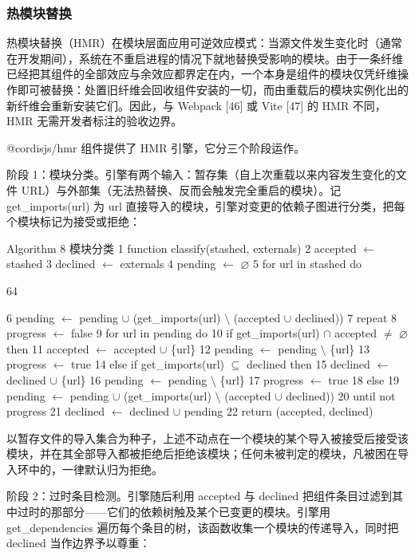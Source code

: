 \documentclass[
  10
]{article}
\begin{document}
\subsubsection{热模块替换} \label{hot-module-replacement}

热模块替换（HMR）在模块层面应用可逆效应模式：当源文件发生变化时（通常在开发期间），系统在不重启进程的情况下就地替换受影响的模块。由于一条纤维已经把其组件的全部效应与余效应都界定在内，一个本身是组件的模块仅凭纤维操作即可被替换：处置旧纤维会回收组件安装的一切，而由重载后的模块实例化出的新纤维会重新安装它们。因此，与 Webpack {[}46{]} 或 Vite {[}47{]} 的 HMR 不同，HMR 无需开发者标注的验收边界。

@cordisjs/hmr 组件提供了 HMR 引擎，它分三个阶段运作。

阶段 1：模块分类。引擎有两个输入：暂存集（自上次重载以来内容发生变化的文件 URL）与外部集（无法热替换、反而会触发完全重启的模块）。记 get\_imports(url) 为 url 直接导入的模块，引擎对变更的依赖子图进行分类，把每个模块标记为接受或拒绝：

Algorithm 8 模块分类 1 function classify(stashed,
externals) 2 accepted $\leftarrow$ stashed 3 declined $\leftarrow$ externals 4 pending $\leftarrow$ $\varnothing$ 5
for url in stashed do

64

6 pending $\leftarrow$ pending $\cup$ (get\_imports(url) $\setminus$ (accepted $\cup$ declined)) 7
repeat 8 progress $\leftarrow$ false 9 for url in pending do 10 if
get\_imports(url) $\cap$ accepted $\neq$ $\varnothing$ then 11 accepted $\leftarrow$ accepted $\cup$ \{url\}
12 pending $\leftarrow$ pending $\setminus$ \{url\} 13 progress $\leftarrow$ true 14 else if
get\_imports(url) $\subseteq$ declined then 15 declined $\leftarrow$ declined $\cup$ \{url\} 16
pending $\leftarrow$ pending $\setminus$ \{url\} 17 progress $\leftarrow$ true 18 else 19 pending $\leftarrow$
pending $\cup$ (get\_imports(url) $\setminus$ (accepted $\cup$ declined)) 20 until not
progress 21 declined $\leftarrow$ declined $\cup$ pending 22 return (accepted, declined)

以暂存文件的导入集合为种子，上述不动点在一个模块的某个导入被接受后接受该模块，并在其全部导入都被拒绝后拒绝该模块；任何未被判定的模块，凡被困在导入环中的，一律默认归为拒绝。

阶段 2：过时条目检测。引擎随后利用 accepted 与 declined 把组件条目过滤到其中过时的那部分——它们的依赖树触及某个已变更的模块。引擎用 get\_dependencies 遍历每个条目的树，该函数收集一个模块的传递导入，同时把 declined 当作边界予以尊重：
\end{document}
